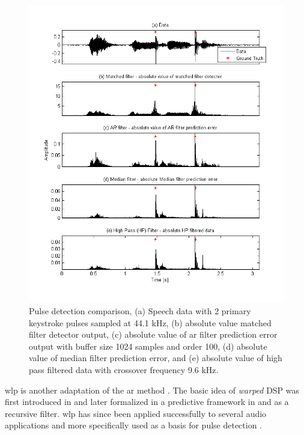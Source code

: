 \begin{figure}[!] %
\centering
\includegraphics[width=130mm]{LitRev_DetectCompare2New.png}
\caption{Pulse detection comparison, (a) Speech data with 2 primary keystroke pulses sampled at 44.1 kHz, (b) absolute value matched filter detector output, (c) absolute value of \gls{ar} filter prediction error output with buffer size 1024 samples and order 100, (d) absolute value of median filter prediction error, and (e) absolute value of high pass filtered data with crossover frequency 9.6 kHz.}
\label{fig:LitRev_DetectCompare2}
\end{figure}

\gls{wlp} is another adaptation of the \gls{ar} method \cite{Esquef2002}. The basic idea of \emph{warped} DSP was first introduced in \cite{Oppenheim1983} and later formalized in a predictive framework in \cite{Strube1980} and as a recursive filter\cite{Steiglitz1980}. \gls{wlp} has since been applied successfully to several audio applications \cite{Karjalainen1997}\cite{Haermae2000} and more specifically used as a basis for pulse detection \cite{Esquef2000}\cite{Esquef2002}.

